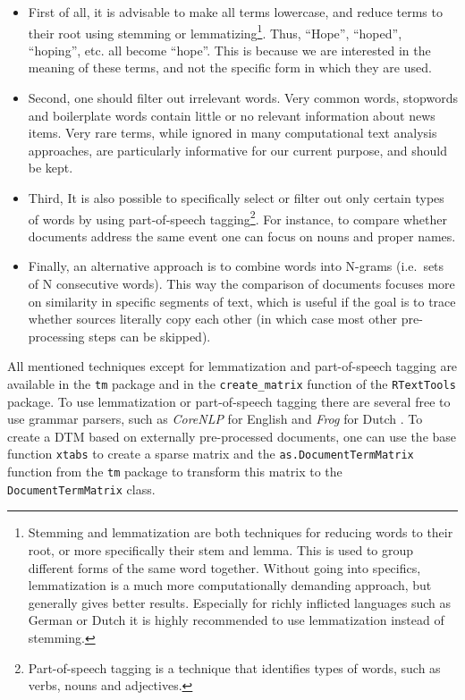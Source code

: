 \documentclass[]{article}
\let\rmarkdownfootnote\footnote%
\def\footnote{\protect\rmarkdownfootnote}
\begin{document}
\begin{itemize}
\item
  First of all, it is advisable to make all terms lowercase, and reduce
  terms to their root using stemming or lemmatizing\footnote{Stemming
    and lemmatization are both techniques for reducing words to their
    root, or more specifically their stem and lemma. This is used to
    group different forms of the same word together. Without going into
    specifics, lemmatization is a much more computationally demanding
    approach, but generally gives better results. Especially for richly
    inflicted languages such as German or Dutch it is highly recommended
    to use lemmatization instead of stemming.}. Thus, ``Hope'',
  ``hoped'', ``hoping'', etc. all become ``hope''. This is because we
  are interested in the meaning of these terms, and not the specific
  form in which they are used.
\item
  Second, one should filter out irrelevant words. Very common words,
  stopwords and boilerplate words contain little or no relevant
  information about news items. Very rare terms, while ignored in many
  computational text analysis approaches, are particularly informative
  for our current purpose, and should be kept.
\item
  Third, It is also possible to specifically select or filter out only
  certain types of words by using part-of-speech tagging\footnote{Part-of-speech
    tagging is a technique that identifies types of words, such as
    verbs, nouns and adjectives.}. For instance, to compare whether
  documents address the same event one can focus on nouns and proper
  names.
\item
  Finally, an alternative approach is to combine words into N-grams
  (i.e.~sets of N consecutive words). This way the comparison of
  documents focuses more on similarity in specific segments of text,
  which is useful if the goal is to trace whether sources literally copy
  each other (in which case most other pre-processing steps can be
  skipped).
\end{itemize}

All mentioned techniques except for lemmatization and part-of-speech
tagging are available in the \texttt{tm} package and in the
\texttt{create\_matrix} function of the \texttt{RTextTools} package. To
use lemmatization or part-of-speech tagging there are several free to
use grammar parsers, such as \emph{CoreNLP} for English \citep{corenlp}
and \emph{Frog} for Dutch \citep{bosch07}. To create a DTM based on
externally pre-processed documents, one can use the base function
\texttt{xtabs} to create a sparse matrix and the
\texttt{as.DocumentTermMatrix} function from the \texttt{tm} package to
transform this matrix to the \texttt{DocumentTermMatrix} class.
\end{document}
